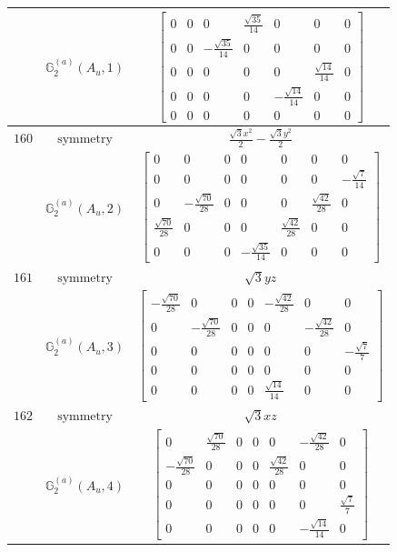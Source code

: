 \documentclass[fleqn,8pt,landscape]{jsarticle}
\begin{document}
\begin{longtable}{ccc}
$  $ & $ \mathbb{G}_{2}^{(a)}(A_{u},1) $ & $ \begin{bmatrix} 0 & 0 & 0 & \frac{\sqrt{35}}{14} & 0 & 0 & 0 \\ 0 & 0 & - \frac{\sqrt{35}}{14} & 0 & 0 & 0 & 0 \\ 0 & 0 & 0 & 0 & 0 & \frac{\sqrt{14}}{14} & 0 \\ 0 & 0 & 0 & 0 & - \frac{\sqrt{14}}{14} & 0 & 0 \\ 0 & 0 & 0 & 0 & 0 & 0 & 0 \end{bmatrix} $ \\ \hline
$ 160 $ & $ \text{symmetry} $ & $ \frac{\sqrt{3} x^{2}}{2} - \frac{\sqrt{3} y^{2}}{2} $ \\
$  $ & $ \mathbb{G}_{2}^{(a)}(A_{u},2) $ & $ \begin{bmatrix} 0 & 0 & 0 & 0 & 0 & 0 & 0 \\ 0 & 0 & 0 & 0 & 0 & 0 & - \frac{\sqrt{7}}{14} \\ 0 & - \frac{\sqrt{70}}{28} & 0 & 0 & 0 & \frac{\sqrt{42}}{28} & 0 \\ \frac{\sqrt{70}}{28} & 0 & 0 & 0 & \frac{\sqrt{42}}{28} & 0 & 0 \\ 0 & 0 & 0 & - \frac{\sqrt{35}}{14} & 0 & 0 & 0 \end{bmatrix} $ \\ \hline
$ 161 $ & $ \text{symmetry} $ & $ \sqrt{3} y z $ \\
$  $ & $ \mathbb{G}_{2}^{(a)}(A_{u},3) $ & $ \begin{bmatrix} - \frac{\sqrt{70}}{28} & 0 & 0 & 0 & - \frac{\sqrt{42}}{28} & 0 & 0 \\ 0 & - \frac{\sqrt{70}}{28} & 0 & 0 & 0 & - \frac{\sqrt{42}}{28} & 0 \\ 0 & 0 & 0 & 0 & 0 & 0 & - \frac{\sqrt{7}}{7} \\ 0 & 0 & 0 & 0 & 0 & 0 & 0 \\ 0 & 0 & 0 & 0 & \frac{\sqrt{14}}{14} & 0 & 0 \end{bmatrix} $ \\ \hline
$ 162 $ & $ \text{symmetry} $ & $ \sqrt{3} x z $ \\
$  $ & $ \mathbb{G}_{2}^{(a)}(A_{u},4) $ & $ \begin{bmatrix} 0 & \frac{\sqrt{70}}{28} & 0 & 0 & 0 & - \frac{\sqrt{42}}{28} & 0 \\ - \frac{\sqrt{70}}{28} & 0 & 0 & 0 & \frac{\sqrt{42}}{28} & 0 & 0 \\ 0 & 0 & 0 & 0 & 0 & 0 & 0 \\ 0 & 0 & 0 & 0 & 0 & 0 & \frac{\sqrt{7}}{7} \\ 0 & 0 & 0 & 0 & 0 & - \frac{\sqrt{14}}{14} & 0 \end{bmatrix} $ \\ \hline

\end{longtable}
\end{document}
